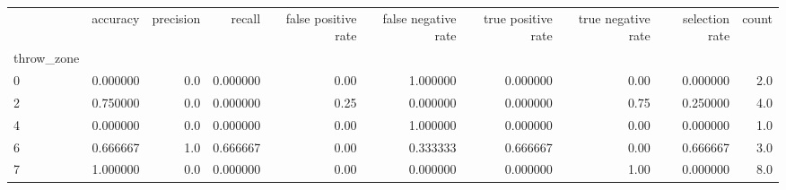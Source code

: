 \begin{tabular}{lrrrrrrrrr}
\toprule
{} &  accuracy &  precision &    recall &  false positive rate &  false negative rate &  true positive rate &  true negative rate &  selection rate &  count \\
throw\_zone &           &            &           &                      &                      &                     &                     &                 &        \\
\midrule
0          &  0.000000 &        0.0 &  0.000000 &                 0.00 &             1.000000 &            0.000000 &                0.00 &        0.000000 &    2.0 \\
2          &  0.750000 &        0.0 &  0.000000 &                 0.25 &             0.000000 &            0.000000 &                0.75 &        0.250000 &    4.0 \\
4          &  0.000000 &        0.0 &  0.000000 &                 0.00 &             1.000000 &            0.000000 &                0.00 &        0.000000 &    1.0 \\
6          &  0.666667 &        1.0 &  0.666667 &                 0.00 &             0.333333 &            0.666667 &                0.00 &        0.666667 &    3.0 \\
7          &  1.000000 &        0.0 &  0.000000 &                 0.00 &             0.000000 &            0.000000 &                1.00 &        0.000000 &    8.0 \\
\bottomrule
\end{tabular}

